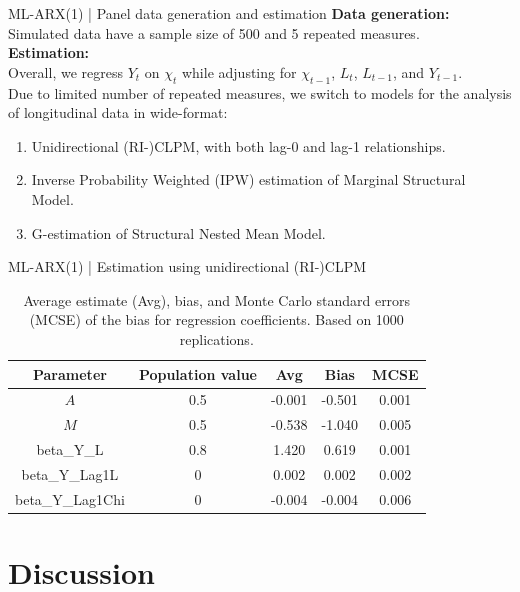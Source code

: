 \documentclass[aspectratio=169, xcolor=dvipsnames]{beamer} %
\begin{document}
\begin{frame}{ML-ARX(1) | Panel data generation and estimation}
    \textbf{Data generation:}\\
    Simulated data have a sample size of 500 and 5 repeated measures.\\
    \bigskip
    \textbf{Estimation:}\\
    Overall, we regress $Y_{t}$ on $\chi_{t}$ while adjusting for $\chi_{t - 1}$, $L_{t}$, $L_{t - 1}$, and $Y_{t - 1}$. \\
    \bigskip
    Due to limited number of repeated measures, we switch to models for the analysis of longitudinal data in wide-format:
    \begin{enumerate}
        \item Unidirectional (RI-)CLPM, with both lag-0 and lag-1 relationships. 
        \item Inverse Probability Weighted (IPW) estimation of Marginal Structural Model. 
        \item G-estimation of Structural Nested Mean Model. 
    \end{enumerate}
\end{frame}

    
\begin{frame}{ML-ARX(1) | Estimation using unidirectional (RI-)CLPM}
    \begin{table}[]
        \centering
        \begin{tabular}[t]{ccccc}
            \toprule
            Parameter & Population value & Avg & Bias & MCSE \\
            \midrule
            $A$ & 0.5 & -0.001 & -0.501 & 0.001 \\
            $M$ & 0.5 & -0.538 & -1.040 & 0.005\\
            beta\_Y\_L & 0.8 & 1.420 & 0.619 & 0.001\\
            beta\_Y\_Lag1L & 0 & 0.002 & 0.002 & 0.002\\
            beta\_Y\_Lag1Chi & 0 & -0.004 & -0.004 & 0.006\\
            \bottomrule
        \end{tabular}
        \caption{\footnotesize{Average estimate (Avg), bias, and Monte Carlo standard errors (MCSE) of the bias for regression coefficients. Based on 1000 replications.}}
    \end{table}
\end{frame}


\section{Discussion}
\end{document}
